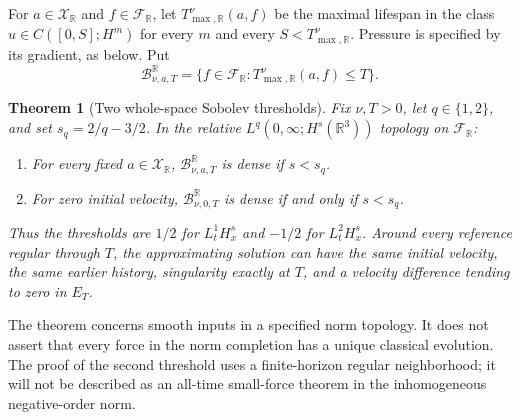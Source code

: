 \documentclass[11pt,a4paper]{article}
\newtheorem{theorem}{Theorem}[section]
\theoremstyle{definition}\newtheorem{definition}[theorem]{Definition}
\theoremstyle{remark}\newtheorem{remark}[theorem]{Remark}
\newcommand{\R}{\mathbb R}\newcommand{\TT}{\mathbb T^3}
\begin{document}
For $a\in\mathcal X_{\R}$ and $f\in\mathcal F_{\R}$, let $T^\nu_{\max,\R}(a,f)$ be the maximal lifespan in the class $u\in C([0,S];H^m)$ for every $m$ and every $S<T^\nu_{\max,\R}$. Pressure is specified by its gradient, as below. Put
\[
 \mathcal B^\R_{\nu,a,T}
 =\{f\in\mathcal F_{\R}:T^\nu_{\max,\R}(a,f)\le T\}.
\]

\begin{theorem}[Two whole-space Sobolev thresholds]\label{thm:Rmain}
Fix $\nu,T>0$, let $q\in\{1,2\}$, and set $s_q=2/q-3/2$. In the relative $L^q(0,\infty;H^s(\R^3))$ topology on $\mathcal F_{\R}$:
\begin{enumerate}[label=(\roman*),nosep]
\item For every fixed $a\in\mathcal X_{\R}$, $\mathcal B^\R_{\nu,a,T}$ is dense if $s<s_q$.
\item For zero initial velocity, $\mathcal B^\R_{\nu,0,T}$ is dense if and only if $s<s_q$.
\end{enumerate}
Thus the thresholds are $1/2$ for $L^1_tH^s_x$ and $-1/2$ for $L^2_tH^s_x$. Around every reference regular through $T$, the approximating solution can have the same initial velocity, the same earlier history, singularity exactly at $T$, and a velocity difference tending to zero in $E_T$.
\end{theorem}

The theorem concerns smooth inputs in a specified norm topology. It does not assert that every force in the norm completion has a unique classical evolution. The proof of the second threshold uses a finite-horizon regular neighborhood; it will not be described as an all-time small-force theorem in the inhomogeneous negative-order norm.
\end{document}
